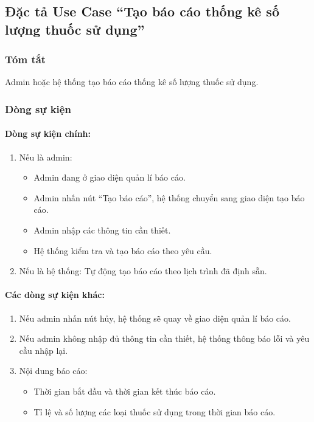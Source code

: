 \subsection{Đặc tả Use Case ``Tạo báo cáo thống kê số lượng thuốc sử dụng''}

\subsubsection{Tóm tắt}
Admin hoặc hệ thống tạo báo cáo thống kê số lượng thuốc sử dụng.

\subsubsection{Dòng sự kiện}
\paragraph{\textbf{Dòng sự kiện chính:}}
\begin{enumerate}
  \item Nếu là admin:
  \begin{itemize}
    \item Admin đang ở giao diện quản lí báo cáo.
    \item Admin nhấn nút ``Tạo báo cáo'', hệ thống chuyển sang giao diện tạo báo cáo.
    \item Admin nhập các thông tin cần thiết.
    \item Hệ thống kiểm tra và tạo báo cáo theo yêu cầu.
  \end{itemize}
  \item Nếu là hệ thống: Tự động tạo báo cáo theo lịch trình đã định sẵn.
\end{enumerate}

\paragraph{\textbf{Các dòng sự kiện khác:}}
\begin{enumerate}
  \item Nếu admin nhấn nút hủy, hệ thống sẽ quay về giao diện quản lí báo cáo.
  \item Nếu admin không nhập đủ thông tin cần thiết, hệ thống thông báo lỗi và yêu cầu nhập lại.
  \item Nội dung báo cáo:
  \begin{itemize}
    \item Thời gian bắt đầu và thời gian kết thúc báo cáo.
    \item Tỉ lệ và số lượng các loại thuốc sử dụng trong thời gian báo cáo.
  \end{itemize}
\end{enumerate}

